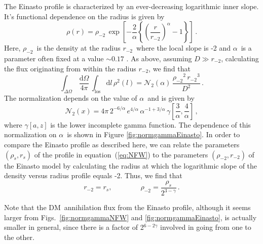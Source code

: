 \documentclass[aps,prd,twocolumn,amsmath,amssymb,floatfix,nofootinbib,10pt]{revtex4}
\newcommand{\DM}{DM}
\newcommand{\dd}{\mathrm{d}}
\newcommand{\eqnname}{equation}
\newcommand{\los}{los}
\newcommand{\rhos}{\ensuremath{\rho_s}}
\newcommand{\rs}{\ensuremath{r_s}}
\newcommand{\dist}{\ensuremath{D}}
\newcommand{\norm}{\ensuremath{\mathcal{N}}}
\newcommand{\normeinasto}{\ensuremath{\norm_2}}
\newcommand{\rhominustwo}{\ensuremath{\rho_{-2}}}
\newcommand{\rminustwo}{\ensuremath{r_{-2}}}
\newcommand{\alphaEinasto}{\ensuremath{\alpha}}
\begin{document}
The Einasto profile is characterized by an ever-decreasing logarithmic
inner slope. It's functional dependence on the radius is given by
\begin{equation}\label{eq:einasto}
\rho (r) = \rhominustwo\, \exp\left[-\frac{2}{\alpha}\left\{\left(\frac{r}{\rminustwo}\right)^{\alpha}-1\right\}\right]\, .
\end{equation}
Here, \rhominustwo\ is the density at the radius \rminustwo\ where the
local slope is -2 and \alphaEinasto\ is a parameter often fixed at a
value $\sim\!0.17$ \cite{2008MNRAS.391.1685S}. As above, assuming
$\dist \gg \rminustwo$, calculating the flux originating from within
the radius \rminustwo, we find that
\begin{equation}\label{eq:lumrhosrsEinasto}
\int_{\Delta\Omega}\,\frac{\dd\Omega}{4\pi}\,\int_{\mathrm{\los}} \dd
l\, \rho^2(l)= \normeinasto(\alpha)\, \frac{\rhominustwo^2\, \rminustwo^3}{\dist^2}\, .
\end{equation}
The normalization depends on the value of \alphaEinasto\ and is given
by
\begin{equation}\label{eq:normgammaEinasto}
\normeinasto(x) = 4 \pi \, 2^{-6/\alpha}\,e^{4/\alpha}\,
\alpha^{-1+3/\alpha}\,
\gamma\left[\frac{3}{\alpha},\frac{4}{\alpha}\right]\,
,
\end{equation}
where $\gamma[a,z]$ is the lower incomplete gamma function. The
dependence of this normalization on \alphaEinasto\ is shown in Figure
\ref{fig:normgammaEinasto}. In order to compare the Einasto profile as
described here, we can relate the parameters $(\rhos,\rs)$ of the
profile in \eqnname\ (\ref{eq:NFW}) to the parameters
$(\rhominustwo,\rminustwo)$ of the Einasto model by calculating the
radius at which the logarithmic slope of the density versus radius
profile equals -2. Thus, we find that
\begin{equation}
\rminustwo = \rs,  \qquad \qquad \rhominustwo = \frac{\rhos}{2^{3-\gamma}}\, .
\end{equation}

Note that the \DM\ annihilation flux from the Einasto profile,
although it seems larger from Figs.~\ref{fig:normgammaNFW} and
\ref{fig:normgammaEinasto}, is actually smaller in general, since
there is a factor of 2$^{6-2\gamma}$ involved in going from one to the
other.
\end{document}
